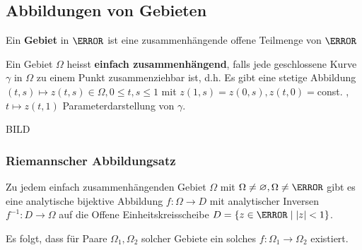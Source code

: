 \subsection{Abbildungen von Gebieten}
\begin{def*}[note = Gebiet , index = Gebiet]
	Ein \textbf{Gebiet} in $\C$ ist eine zusammenhängende offene Teilmenge von $\C$
\end{def*}
\begin{def*}[note = einfach zusammenhängend , index = einfach zusammenhängend , indexformat = {2!~1 }]
	Ein Gebiet $\Omega$ heisst \textbf{einfach zusammenhängend}, falls jede geschlossene Kurve $\gamma$ in $\Omega$ zu einem Punkt zusammenziehbar ist, d.h. Es gibt eine stetige Abbildung $(t,s) \mapsto z(t,s) \in \Omega , 0 \leq t , s \leq 1$ mit $z(1,s) = z(0,s) , z(t,0) = $const. , $t \mapsto z(t,1)$ Parameterdarstellung von $\gamma$.
\end{def*}
\begin{bsp*}
	BILD
\end{bsp*}

\subsubsection{Riemannscher Abbildungsatz}
Zu jedem einfach zusammenhängenden Gebiet $\Omega$ mit $\Omega \neq \varnothing , \Omega \neq \C$ gibt es eine analytische bijektive Abbildung $f: \Omega \rightarrow D$ mit analytischer Inversen $f^{-1} : D \rightarrow \Omega$ auf die Offene Einheitskreisscheibe $D = \{ z \in \C \mid \abs{z} < 1 \}$.

Es folgt, dass für Paare $\Omega_1 , \Omega_2$ solcher Gebiete ein solches $f: \Omega_1 \rightarrow \Omega_2$ existiert.

